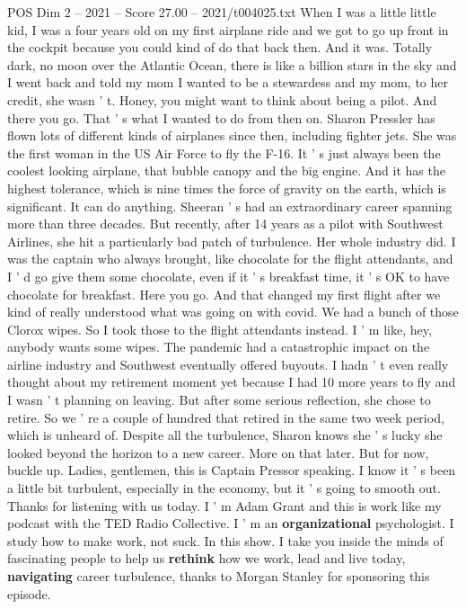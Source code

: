 \begin{textsample}{POS Dim 2 – 2021 – Score 27.00 – 2021/t004025.txt}  \label{ex:f2_pos_028}
When I was a little little kid, I was a four years old on my first airplane ride and we got to go up front in the cockpit because you could kind of do that back then.
And it was.
Totally dark, no moon over the Atlantic Ocean, there is like a billion stars in the sky and I went back and told my mom I wanted to be a stewardess and my mom, to her credit, she wasn ' t.
Honey, you might want to think about being a pilot.
And there you go.
That ' s what I wanted to do from then on.
Sharon Pressler has flown lots of different kinds of airplanes since then, including fighter jets.
She was the first woman in the US Air Force to fly the F-16.
It ' s just always been the coolest looking airplane, that bubble canopy and the big engine.
And it has the highest tolerance, which is nine times the force of gravity on the earth, which is significant.
It can do anything.
Sheeran ' s had an extraordinary career spanning more than three decades.
But recently, after 14 years as a pilot with Southwest Airlines, she hit a particularly bad patch of turbulence.
Her whole industry did.
I was the captain who always brought, like chocolate for the flight attendants, and I ' d go give them some chocolate, even if it ' s breakfast time, it ' s OK to have chocolate for breakfast.
Here you go.
And that changed my first flight after we kind of really understood what was going on with covid.
We had a bunch of those Clorox wipes.
So I took those to the flight attendants instead.
I ' m like, hey, anybody wants some wipes.
The pandemic had a catastrophic impact on the airline industry and Southwest eventually offered buyouts.
I hadn ' t even really thought about my retirement moment yet because I had 10 more years to fly and I wasn ' t planning on leaving.
But after some serious reflection, she chose to retire.
So we ' re a couple of hundred that retired in the same two week period, which is unheard of.
Despite all the turbulence, Sharon knows she ' s lucky she looked beyond the horizon to a new career.
More on that later.
But for now, buckle up.
Ladies, gentlemen, this is Captain Pressor speaking.
I know it ' s been a little bit turbulent, especially in the economy, but it ' s going to smooth out.
Thanks for listening with us today.
I ' m Adam Grant and this is work like my podcast with the TED Radio Collective.
I ' m an \textbf{organizational} psychologist.
I study how to make work, not suck.
In this show.
I take you inside the minds of fascinating people to help us \textbf{rethink} how we work, lead and live today, \textbf{navigating} career turbulence, thanks to Morgan Stanley for sponsoring this episode.

\end{textsample}
